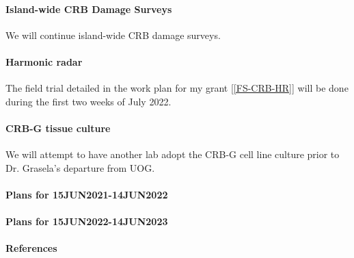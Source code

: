 \begin{refsection}
\paragraph{Island-wide CRB Damage Surveys} We will continue island-wide CRB damage surveys.

\paragraph{Harmonic radar} The field trial detailed in the work plan for my grant [\ref{FS-CRB-HR}] will be done during the first two weeks of July 2022. 

\paragraph{CRB-G tissue culture} We will attempt to have another lab adopt the CRB-G cell line culture prior to Dr. Grasela's departure from UOG.

\paragraph{Plans for 15JUN2021-14JUN2022}
\paragraph{Plans for 15JUN2022-14JUN2023}

\paragraph{References}
\printbibliography[heading=none]

\end{refsection}


